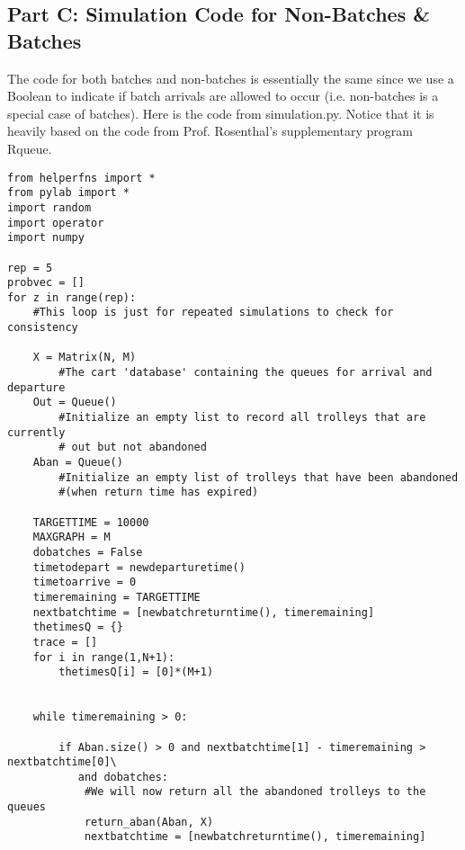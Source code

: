 \documentclass[english]{article}
\begin{document}
\subsection*{Part C: Simulation Code for Non-Batches \& Batches}
The code for both batches and non-batches is essentially the same since we use a Boolean to indicate if batch arrivals are allowed to occur (i.e. non-batches is a special case of batches). Here is the code from simulation.py. Notice that it is heavily based on the code from Prof. Rosenthal's supplementary program Rqueue.
\begin{singlespace}
\begin{verbatim}
from helperfns import *
from pylab import *
import random
import operator
import numpy

rep = 5
probvec = []
for z in range(rep):
    #This loop is just for repeated simulations to check for consistency

    X = Matrix(N, M)  
        #The cart 'database' containing the queues for arrival and departure
    Out = Queue()     
        #Initialize an empty list to record all trolleys that are currently 
        # out but not abandoned
    Aban = Queue()    
        #Initialize an empty list of trolleys that have been abandoned 
        #(when return time has expired)
    
    TARGETTIME = 10000
    MAXGRAPH = M 
    dobatches = False
    timetodepart = newdeparturetime() 
    timetoarrive = 0 
    timeremaining = TARGETTIME 
    nextbatchtime = [newbatchreturntime(), timeremaining]
    thetimesQ = {}
    trace = []
    for i in range(1,N+1):
        thetimesQ[i] = [0]*(M+1)
    

    while timeremaining > 0:
        
        if Aban.size() > 0 and nextbatchtime[1] - timeremaining > nextbatchtime[0]\
           and dobatches:
            #We will now return all the abandoned trolleys to the queues
            return_aban(Aban, X)
            nextbatchtime = [newbatchreturntime(), timeremaining]
        

\end{verbatim}
\end{singlespace}
\end{document}
